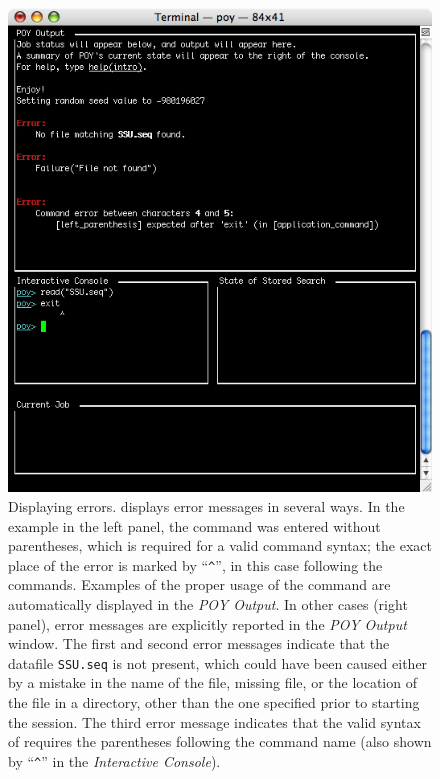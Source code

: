 \begin{figure}
\begin{minipage}[c]{0.48\textwidth}
	   	\includegraphics[width=\textwidth]{doc/figures/figerror2.jpg}
   	\end{minipage}
	
\caption{Displaying errors. \poy displays error messages in several ways. In the example in the left panel, the command  was entered without parentheses, which is required for a  valid \poy command syntax; the exact place of the error is marked by ``\texttt{\^}'', in this case  following the  commands. Examples of the proper usage of the command are automatically displayed in the \emph{POY Output}. In other cases (right panel), error messages are explicitly reported in the \emph{POY Output} window. The first and second error messages indicate that the datafile \texttt{SSU.seq} is not present, which could have been caused either by a mistake in the name of the file, missing file, or the location of the file in a directory, other than the one specified prior to starting the \poy session. The third error message indicates that the valid syntax of  requires the parentheses following the command name (also shown by ``\texttt{\^}'' in  the \emph{Interactive Console}).}
\label{fig:errors}
\end{figure}


